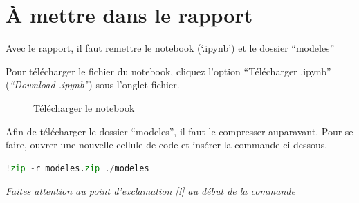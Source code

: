 \documentclass{article}
\begin{document}
\section{À mettre dans le rapport} %
Avec le rapport, il faut remettre le notebook (`.ipynb') et le dossier ``modeles''
\medbreak

Pour télécharger le fichier du notebook, cliquez l'option ``Télécharger .ipynb'' (\textit{``Download .ipynb''}) sous l'onglet fichier.

\begin{figure}[H]
  \centering
  \caption{Télécharger le notebook}
  \label{fig:downloadipynb}
\end{figure}
\medbreak
Afin de télécharger le dossier ``modeles'', il faut le compresser auparavant. Pour se faire, ouvrer une nouvelle cellule de code et insérer la commande ci-dessous.

\begin{lstlisting}[language=Python, caption={Compresser un fichier sur une session}, label={code:zip}]
!zip -r modeles.zip ./modeles
\end{lstlisting}
\smallbreak
\textit{Faites attention au point d'exclamation [!] au début de la commande}
\end{document}
